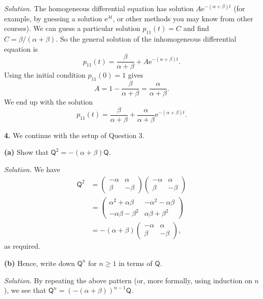 \documentclass[
  a4paper,
]{article}
\theoremstyle{definition}
\theoremstyle{definition}
\theoremstyle{definition}
\theoremstyle{remark}
\begin{document}
\begin{myanswers}
\emph{Solution.}
The homogeneous differential equation has solution \(A \mathrm e^{-(\alpha + \beta)t}\) (for example, by guessing a solution \(\mathrm e^{\lambda t}\), or other methods you may know from other courses). We can guess a particular solution \(p_{11}(t) = C\) and find \(C = \beta/(\alpha + \beta)\). So the general solution of the inhomogeneous differential equation is
\[ p_{11}(t) = \frac{\beta}{\alpha+\beta} + A \mathrm e^{-(\alpha + \beta)t} . \]
Using the initial condition \(p_{11}(0) = 1\) gives
\[ A = 1-\frac{\beta}{\alpha + \beta} = \frac{\alpha}{\alpha + \beta} . \]
We end up with the solution
\[ p_{11}(t) = \frac{\beta}{\alpha + \beta} + \frac{\alpha}{\alpha + \beta} \mathrm e^{-(\alpha + \beta)t} . \]

\end{myanswers}

\textbf{4.} We continue with the setup of Question 3.

\textbf{(a)} Show that \(\mathsf Q^2 = -(\alpha + \beta) \mathsf Q\).

\begin{myanswers}
\emph{Solution.}
We have
\begin{align*}
\mathsf Q^2 &= \begin{pmatrix} -\alpha & \alpha \\ \beta & -\beta \end{pmatrix}\begin{pmatrix} -\alpha & \alpha \\ \beta & -\beta \end{pmatrix} \\ &= \begin{pmatrix} \alpha^2 + \alpha\beta & -\alpha^2 - \alpha\beta \\ -\alpha\beta - \beta^2 & \alpha\beta + \beta^2 \end{pmatrix} \\ &= -(\alpha + \beta) \begin{pmatrix} -\alpha & \alpha \\ \beta & -\beta \end{pmatrix} , 
\end{align*}
as required.

\end{myanswers}

\textbf{(b)} Hence, write down \(\mathsf Q^n\) for \(n \geq 1\) in terms of \(\mathsf Q\).

\begin{myanswers}
\emph{Solution.}
By repeating the above pattern (or, more formally, using induction on \(n\)), we see that \(\mathsf Q^n = (-(\alpha+\beta))^{n-1} \mathsf Q\).

\end{myanswers}
\end{document}
